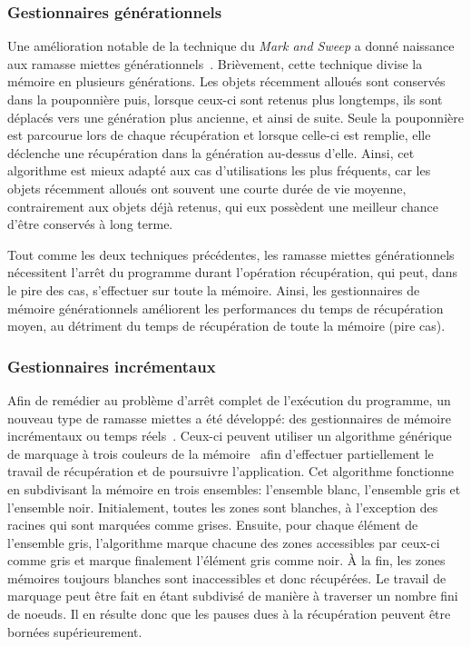 \documentclass[12pt,twoside,letterpaper,francais]{book}
\begin{document}
\FloatBarrier
\subsubsection{Gestionnaires gé\-né\-ra\-tion\-nels}
Une amélioration notable de la technique du \textit{Mark and Sweep} a
donné naissance aux ramasse miettes
gé\-né\-ra\-tion\-nels~\cite{GEN_GC}. Brièvement, cette technique
divise la mémoire en plusieurs générations. Les objets récemment
alloués sont conservés dans la pouponnière puis, lorsque ceux-ci sont
retenus plus longtemps, ils sont déplacés vers une génération plus
ancienne, et ainsi de suite. Seule la pouponnière est parcourue lors
de chaque récupération et lorsque celle-ci est remplie, elle déclenche
une récupération dans la génération au-dessus d'elle. Ainsi, cet
algorithme est mieux adapté aux cas d'utilisations les plus fréquents,
car les objets récemment alloués ont souvent une courte durée de vie
moyenne, contrairement aux objets déjà retenus, qui eux possèdent une
meilleur chance d'être conservés à long terme.

Tout comme les deux techniques précédentes, les ramasse miettes
gé\-né\-ra\-tion\-nels nécessitent l'arrêt du programme durant
l'opération récupération, qui peut, dans le pire des cas, s'effectuer
sur toute la mémoire. Ainsi, les gestionnaires de mémoire
gé\-né\-ra\-tion\-nels améliorent les performances du temps de
récupération moyen, au détriment du temps de récupération de toute la
mémoire (pire cas).


\FloatBarrier
\subsubsection{Gestionnaires incrémentaux}
Afin de remédier au problème d'arrêt complet de l'exécution du
programme, un nouveau type de ramasse miettes a été développé: des
gestionnaires de mémoire incrémentaux ou temps
réels~\cite{INCR_BAKER}. Ceux-ci peuvent utiliser un algorithme
générique de marquage à trois couleurs de la
mémoire~\cite{dijkstra-tricolour} afin d'effectuer partiellement le
travail de récupération et de poursuivre l'application. Cet algorithme
fonctionne en subdivisant la mémoire en trois ensembles: l'ensemble
blanc, l'ensemble gris et l'ensemble noir. Initialement, toutes les
zones sont blanches, à l'exception des racines qui sont marquées comme
grises. Ensuite, pour chaque élément de l'ensemble gris, l'algorithme
marque chacune des zones accessibles par ceux-ci comme gris et marque
finalement l'élément gris comme noir. À la fin, les zones mémoires
toujours blanches sont inaccessibles et donc récupérées.  Le travail
de marquage peut être fait en étant subdivisé de manière à traverser
un nombre fini de noeuds. Il en résulte donc que les pauses dues à la
récupération peuvent être bornées supérieurement.
\end{document}
